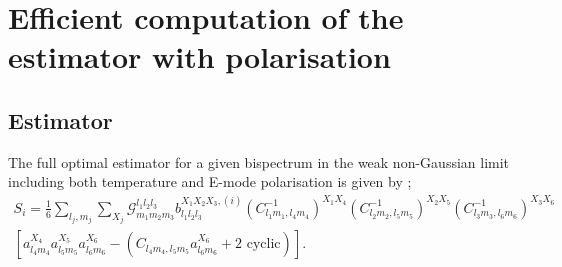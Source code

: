 \section{Efficient computation of the estimator with polarisation} \label{section: Efficient computation of KSW estimator with polarisation}

\subsection{Estimator}

The full optimal estimator for a given bispectrum in the weak non-Gaussian limit including both temperature and E-mode polarisation is given by \cite{Komatsu2005,Komatsu2010};
\begin{eqnarray}
	S_i =  \frac{1}{6} \sum_{l_j, m_j} \sum_{X_j} \mathcal{G}_{m_1 m_2 m_3}^{l_1 l_2 l_3} b_{l_1 l_2 l_3} ^{X_1 X_2 X_3, (i)} (C_{l_1 m_1, l_4 m_4}^{-1})^{X_1 X_4} (C_{l_2 m_2, l_5 m_5}^{-1})^{X_2 X_5} (C_{l_3 m_3, l_6 m_6}^{-1})^{X_3 X_6} \nonumber \\  \left[ a_{l_4 m_4}^{X_4} a_{l_5 m_5}^{X_5} a_{l_6 m_6}^{X_6} -  \left( C_{l_4 m_4, l_5 m_5} a_{l_6 m_6}^{X_6} + \text{2 cyclic} \right)   \right].
	\label{Estimator full definition}
\end{eqnarray}


